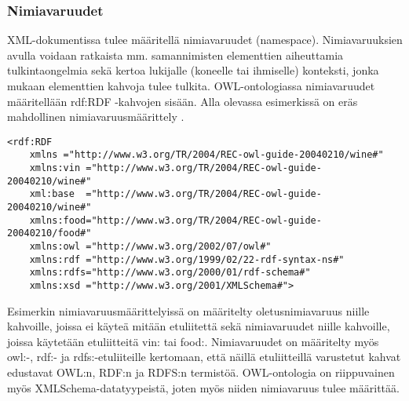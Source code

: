 \documentclass[a4paper,10pt]{article}
\begin{document}
\subsubsection{Nimiavaruudet}
XML-dokumentissa tulee määritellä nimiavaruudet (namespace). Nimiavaruuksien avulla voidaan ratkaista mm. samannimisten elementtien aiheuttamia tulkintaongelmia sekä kertoa lukijalle (koneelle tai ihmiselle) konteksti, jonka mukaan elementtien kahvoja tulee tulkita. OWL-ontologiassa nimiavaruudet määritellään rdf:RDF -kahvojen sisään. Alla olevassa esimerkissä on eräs mahdollinen nimiavaruusmäärittely \cite{BHL01}. 
\begin{verbatim}
<rdf:RDF 
    xmlns ="http://www.w3.org/TR/2004/REC-owl-guide-20040210/wine#" 
    xmlns:vin ="http://www.w3.org/TR/2004/REC-owl-guide-20040210/wine#"       
    xml:base  ="http://www.w3.org/TR/2004/REC-owl-guide-20040210/wine#"       
    xmlns:food="http://www.w3.org/TR/2004/REC-owl-guide-20040210/food#"    
    xmlns:owl ="http://www.w3.org/2002/07/owl#"
    xmlns:rdf ="http://www.w3.org/1999/02/22-rdf-syntax-ns#"
    xmlns:rdfs="http://www.w3.org/2000/01/rdf-schema#"
    xmlns:xsd ="http://www.w3.org/2001/XMLSchema#">
\end{verbatim}
Esimerkin nimiavaruusmäärittelyissä on määritelty oletusnimiavaruus niille kahvoille, joissa ei käyteä mitään etuliitettä sekä nimiavaruudet niille kahvoille, joissa käytetään etuliitteitä vin: tai food:. Nimiavaruudet on määritelty myös owl:-, rdf:- ja rdfs:-etuliiteille kertomaan, että näillä etuliitteillä varustetut kahvat edustavat OWL:n, RDF:n ja RDFS:n termistöä. OWL-ontologia on riippuvainen myös XMLSchema-datatyypeistä, joten myös niiden nimiavaruus tulee määrittää. 



\end{document}
